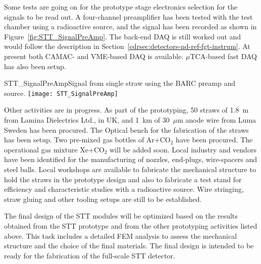 Some tests are going on for the prototype stage electronics selection
for the signals to be read out.   A four-channel preamplifier has been
tested with the test chamber using a radioactive source, and the signal
has been recorded as shown in Figure~\ref{fig:STT_SignalPreAmp}.  The
back-end DAQ is still worked out  and would follow the description 
in Section~\ref{cdrsec:detectors-nd-ref-fgt-instrum}. At
present both CAMAC- and VME-based DAQ is available. $\mu$TCA-based fast
DAQ has also been setup. 
\begin{cdrfigure}
{STT_SignalPreAmp}{Signal from single straw using the BARC preamp and source.}
\texttt{[image: STT\_SignalPreAmp]}
\end{cdrfigure}

Other activities are in progress. As part of the prototyping, 50 straws of 1.8~m from Lamina
Dielectrics Ltd., in UK, and 1~km of 30~$\mu$m anode wire from Luma
Sweden has been procured. The Optical bench for the fabrication of the
straws has been setup.  Two pre-mixed gas bottles of Ar+CO$_2$ have been
procured. The operational gas mixture %
Xe+CO$_2$ will be added
soon. Local industry and vendors have been identified for the
manufacturing of nozzles, end-plugs, wire-spacers and steel
balls. Local workshops are available to fabricate the mechanical
structure to hold the straws in the prototype design and also to
fabricate a test stand for efficiency and characteristic studies  with
a radioactive source. Wire stringing, straw gluing and other tooling
setups are still to be established.


The final design of the STT modules will be optimized based on the
results obtained from the STT prototype and from the other prototyping
activities listed above.  This task includes a detailed FEM analysis to
assess the mechanical structure and the choice of the final
materials. The final design is intended to be ready for the
fabrication of the full-scale STT detector. 



